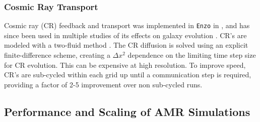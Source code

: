 \documentclass[11pt]{article}
\begin{document}
\subsubsection{Cosmic Ray Transport}


Cosmic ray (CR) feedback and transport was implemented in \texttt{Enzo} in \cite{SalemBryan2014}, and has since been used in multiple studies of its effects on galaxy evolution \citep{SalemBryanHummels, SalemBryanCorlies, Chen2016}. CR's are modeled with a two-fluid method \citep{Drury1985, DruryFalle1986,Jun1994}. The CR diffusion is solved using an explicit finite-difference scheme, creating a $\Delta x^2$ dependence on the limiting time step size for CR evolution. This can be expensive at high resolution. To improve speed, CR's are sub-cycled within each grid up until a communication step is required, providing a factor of 2-5 improvement over non sub-cycled runs.


\subsection{Performance and Scaling of AMR Simulations}
\end{document}
